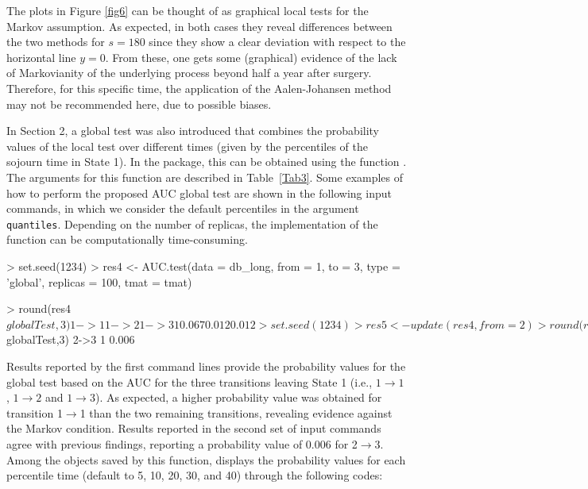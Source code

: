 The plots in Figure \ref{fig6} can be thought of as graphical local tests for the Markov assumption. As expected, in both cases they reveal differences between the two methods for $s=180$ since they show a clear deviation with respect to the horizontal line $y=0$. From these, one gets some (graphical) evidence of the lack of Markovianity of the underlying process beyond half a year after surgery. Therefore, for this specific time, the application of the Aalen-Johansen method may not be recommended here, due to possible biases. %

In Section 2, a global test was also introduced that combines the probability values of the local test over different times (given by the percentiles of the sojourn time in State 1). In the  package, this can be obtained using the function . The arguments for this function are described in Table~\ref{Tab3}. Some examples of how to perform the proposed AUC global test are shown in the following input commands, in which we consider the default percentiles in the argument \texttt{quantiles}. Depending on the number of replicas, the implementation of the  function can be computationally time-consuming.



\begin{example}
> set.seed(1234)
> res4 <- AUC.test(data = db_long, from = 1, to = 3, type = 'global', replicas = 100, 
                   tmat = tmat)    
           
> round(res4$globalTest,3)
   1->1  1->2  1->3
1 0.067 0.012 0.012

> set.seed(1234)
> res5 <- update(res4, from = 2) 
> round(res5$globalTest,3)
    2->3
1  0.006 
\end{example}


Results reported by the first command lines provide the probability values for the global test based on the AUC for the three transitions leaving State 1 (i.e., $1\rightarrow 1$, $1\rightarrow 2$ and $1\rightarrow 3$). As expected, a higher probability value was obtained for transition 1$\rightarrow$1 than the two remaining transitions, revealing evidence against the Markov condition. Results reported in the second set of input commands agree with previous findings, reporting a probability value of 0.006 for 2$\rightarrow$3. Among the objects saved by this function,  displays the probability values for each percentile time (default to 5, 10, 20, 30, and 40) through the following codes:


